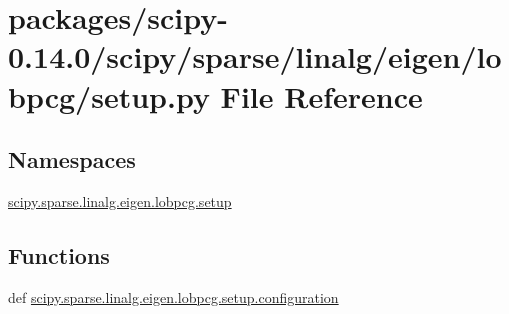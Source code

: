 \hypertarget{packages_2scipy-0_814_80_2scipy_2sparse_2linalg_2eigen_2lobpcg_2setup_8py}{}\section{packages/scipy-\/0.14.0/scipy/sparse/linalg/eigen/lobpcg/setup.py File Reference}
\label{packages_2scipy-0_814_80_2scipy_2sparse_2linalg_2eigen_2lobpcg_2setup_8py}
\subsection*{Namespaces}
\begin{DoxyCompactItemize}
\item 
 \hyperlink{namespacescipy_1_1sparse_1_1linalg_1_1eigen_1_1lobpcg_1_1setup}{scipy.\+sparse.\+linalg.\+eigen.\+lobpcg.\+setup}
\end{DoxyCompactItemize}
\subsection*{Functions}
\begin{DoxyCompactItemize}
\item 
def \hyperlink{namespacescipy_1_1sparse_1_1linalg_1_1eigen_1_1lobpcg_1_1setup_a27d7fb1070cfdba1aeb49bb01d1a2ff9}{scipy.\+sparse.\+linalg.\+eigen.\+lobpcg.\+setup.\+configuration}
\end{DoxyCompactItemize}
